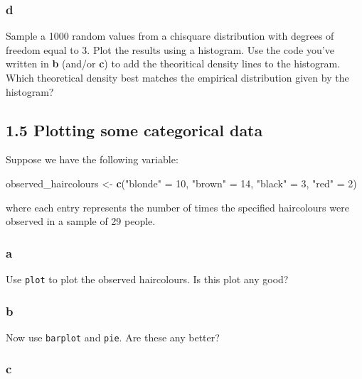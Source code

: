 \documentclass[]{article}
\newenvironment{Shaded}{\begin{snugshade}}{\end{snugshade}}
\newcommand{\DecValTok}[1]{\textcolor[rgb]{0.00,0.00,0.81}{#1}}
\newcommand{\KeywordTok}[1]{\textcolor[rgb]{0.13,0.29,0.53}{\textbf{#1}}}
\newcommand{\NormalTok}[1]{#1}
\newcommand{\StringTok}[1]{\textcolor[rgb]{0.31,0.60,0.02}{#1}}
\begin{document}
\hypertarget{d-2}{%
\subsubsection{d}\label{d-2}}

Sample a 1000 random values from a chisquare distribution with degrees
of freedom equal to 3. Plot the results using a histogram. Use the code
you've written in \textbf{b} (and/or \textbf{c}) to add the theoritical
density lines to the histogram. Which theoretical density best matches
the empirical distribution given by the histogram?

\hypertarget{plotting-some-categorical-data}{%
\subsection{1.5 Plotting some categorical
data}\label{plotting-some-categorical-data}}

Suppose we have the following variable:

\begin{Shaded}
\begin{Highlighting}[]
\NormalTok{observed_haircolours <-}\StringTok{ }\KeywordTok{c}\NormalTok{(}\StringTok{"blonde"}\NormalTok{ =}\StringTok{  }\DecValTok{10}\NormalTok{, }\StringTok{"brown"}\NormalTok{ =}\StringTok{ }\DecValTok{14}\NormalTok{, }\StringTok{"black"}\NormalTok{ =}\StringTok{ }\DecValTok{3}\NormalTok{, }\StringTok{"red"}\NormalTok{ =}\StringTok{ }\DecValTok{2}\NormalTok{)}
\end{Highlighting}
\end{Shaded}

where each entry represents the number of times the specified
haircolours were observed in a sample of 29 people.

\hypertarget{a-4}{%
\subsubsection{a}\label{a-4}}

Use \texttt{plot} to plot the observed haircolours. Is this plot any
good?

\hypertarget{b-4}{%
\subsubsection{b}\label{b-4}}

Now use \texttt{barplot} and \texttt{pie}. Are these any better?

\hypertarget{c-4}{%
\subsubsection{c}\label{c-4}}
\end{document}
